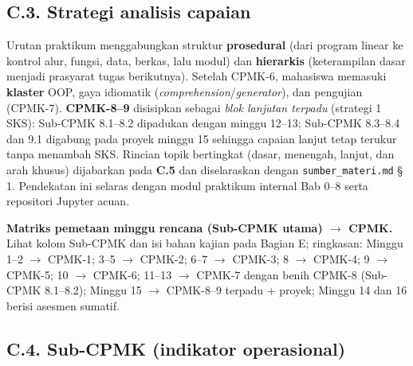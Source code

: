 \documentclass[12pt,a4paper]{article}
\begin{document}
\vspace{0.35cm}

\subsection*{C.3. Strategi analisis capaian}

Urutan praktikum menggabungkan struktur \textbf{prosedural} (dari program linear ke kontrol alur, fungsi, data, berkas, lalu modul) dan \textbf{hierarkis} (keterampilan dasar menjadi prasyarat tugas berikutnya). Setelah CPMK-6, mahasiswa memasuki \textbf{klaster} OOP, gaya idiomatik (\textit{comprehension}/\textit{generator}), dan pengujian (CPMK-7). \textbf{CPMK-8--9} disisipkan sebagai \textit{blok lanjutan terpadu} (strategi 1 SKS): Sub-CPMK 8.1--8.2 dipadukan dengan minggu 12--13; Sub-CPMK 8.3--8.4 dan 9.1 digabung pada proyek minggu 15 sehingga capaian lanjut tetap terukur tanpa menambah SKS. Rincian topik bertingkat (dasar, menengah, lanjut, dan arah khusus) dijabarkan pada \textbf{C.5} dan diselaraskan dengan \texttt{sumber\_materi.md} §\,1. Pendekatan ini selaras dengan modul praktikum internal Bab 0--8 serta repositori Jupyter acuan.

\vspace{0.25cm}

\noindent\textbf{Matriks pemetaan minggu rencana (Sub-CPMK utama) $\rightarrow$ CPMK.} Lihat kolom Sub-CPMK dan isi bahan kajian pada Bagian E; ringkasan: Minggu 1--2 $\rightarrow$ CPMK-1; 3--5 $\rightarrow$ CPMK-2; 6--7 $\rightarrow$ CPMK-3; 8 $\rightarrow$ CPMK-4; 9 $\rightarrow$ CPMK-5; 10 $\rightarrow$ CPMK-6; 11--13 $\rightarrow$ CPMK-7 dengan benih CPMK-8 (Sub-CPMK 8.1--8.2); Minggu 15 $\rightarrow$ CPMK-8--9 terpadu + proyek; Minggu 14 dan 16 berisi asesmen sumatif.

\subsection*{C.4. Sub-CPMK (indikator operasional)}
\end{document}
